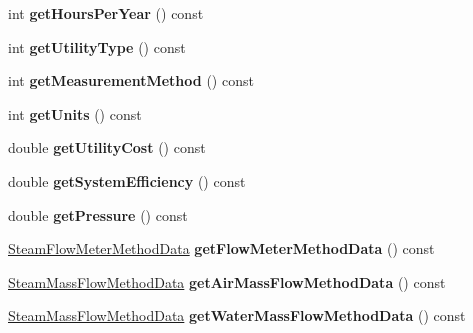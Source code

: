 \begin{DoxyCompactItemize}
\item 
\mbox{\label{class_steam_reduction_input_a7640e0fd2d492f225d1acc970b563d54}} 
int {\bfseries get\+Hours\+Per\+Year} () const
\item 
\mbox{\label{class_steam_reduction_input_ad60f231e29fccf4bdf6821a5adcb1adb}} 
int {\bfseries get\+Utility\+Type} () const
\item 
\mbox{\label{class_steam_reduction_input_a8e6f464d743dfe1de41b1a00f4d29636}} 
int {\bfseries get\+Measurement\+Method} () const
\item 
\mbox{\label{class_steam_reduction_input_a3826819793f0f3f71743eb095df22497}} 
int {\bfseries get\+Units} () const
\item 
\mbox{\label{class_steam_reduction_input_a758bacf2e76372745affad9acffd9129}} 
double {\bfseries get\+Utility\+Cost} () const
\item 
\mbox{\label{class_steam_reduction_input_a818bc57bd61a00a4991d7929045d826a}} 
double {\bfseries get\+System\+Efficiency} () const
\item 
\mbox{\label{class_steam_reduction_input_ab02ca5d6f81ba93c8b0e6b9ad134dbca}} 
double {\bfseries get\+Pressure} () const
\item 
\mbox{\label{class_steam_reduction_input_ac830ce35244e62bdf57a2179ad8ef6c6}} 
\hyperlink{class_steam_flow_meter_method_data}{Steam\+Flow\+Meter\+Method\+Data} {\bfseries get\+Flow\+Meter\+Method\+Data} () const
\item 
\mbox{\label{class_steam_reduction_input_afb59841b5666f33eae95ccea483aea1d}} 
\hyperlink{class_steam_mass_flow_method_data}{Steam\+Mass\+Flow\+Method\+Data} {\bfseries get\+Air\+Mass\+Flow\+Method\+Data} () const
\item 
\mbox{\label{class_steam_reduction_input_a81d1df7d17bcac53c277d371fd0396e1}} 
\hyperlink{class_steam_mass_flow_method_data}{Steam\+Mass\+Flow\+Method\+Data} {\bfseries get\+Water\+Mass\+Flow\+Method\+Data} () const

\end{DoxyCompactItemize}
